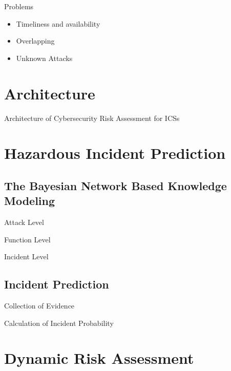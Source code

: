 \documentclass[10pt, compress]{beamer}
\begin{document}
\begin{frame}{Problems}
    \begin{itemize}
      \item Timeliness and availability
      \item Overlapping
      \item Unknown Attacks
    \end{itemize}
\end{frame}

\section{Architecture}
\begin{frame}{Architecture of Cybersecurity Risk Assessment for ICSs}
    \begin{center}
        
    \end{center}
\end{frame}

\section{Hazardous Incident Prediction}
\subsection{The Bayesian Network Based Knowledge Modeling}
\begin{frame}{Attack Level}
\end{frame}

\begin{frame}{Function Level}
\end{frame}

\begin{frame}{Incident Level}
\end{frame}

\subsection{Incident Prediction}
\begin{frame}{Collection of Evidence}
\end{frame}

\begin{frame}{Calculation of Incident Probability}
\end{frame}

\section{Dynamic Risk Assessment}
\end{document}
